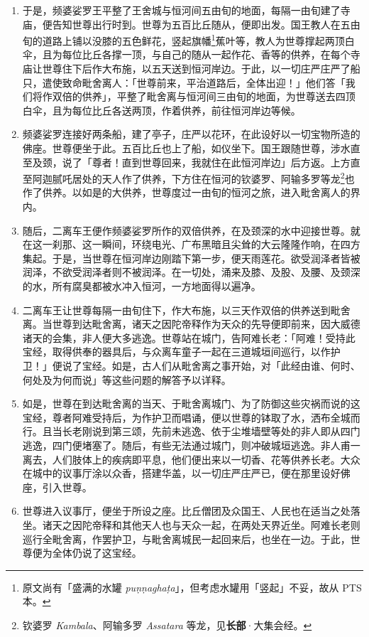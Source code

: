 \begin{enumerate}
\item 于是，频婆娑罗王平整了王舍城与恒河间五由旬的地面，每隔一由旬建了寺庙，便告知世尊出行时到。世尊为五百比丘随从，便即出发。国王教人在五由旬的道路上铺以没膝的五色鲜花，竖起旗幡\footnote{原文尚有「盛满的水罐 \textit{puṇṇaghaṭa}」，但考虑水罐用「竖起」不妥，故从 PTS 本。}蕉叶等，教人为世尊撑起两顶白伞，且为每位比丘各撑一顶，与自己的随从一起作花、香等的供养，在每个寺庙让世尊住下后作大布施，以五天送到恒河岸边。于此，以一切庄严庄严了船只，遣使致命毗舍离人：「世尊前来，平治道路后，全体出迎！」他们答「我们将作双倍的供养」，平整了毗舍离与恒河间三由旬的地面，为世尊送去四顶白伞，且为每位比丘各送两顶，作着供养，前往恒河岸边等候。
\item 频婆娑罗连接好两条船，建了亭子，庄严以花环，在此设好以一切宝物所造的佛座。世尊便坐于此。五百比丘也上了船，如仪坐下。国王跟随世尊，涉水直至及颈，说了「尊者！直到世尊回来，我就住在此恒河岸边」后方返。上方直至阿迦腻吒居处的天人作了供养，下方住在恒河的钦婆罗、阿输多罗等龙\footnote{钦婆罗 \textit{Kambala}、阿输多罗 \textit{Assatara} 等龙，见\textbf{长部}·大集会经。}也作了供养。以如是的大供养，世尊度过一由旬的恒河之旅，进入毗舍离人的界内。
\item 随后，二离车王便作频婆娑罗所作的双倍供养，在及颈深的水中迎接世尊。就在这一刹那、这一瞬间，环绕电光、广布黑暗且尖耸的大云隆隆作响，在四方集起。于是，当世尊在恒河岸边刚踏下第一步，便天雨莲花。欲受润泽者皆被润泽，不欲受润泽者则不被润泽。在一切处，涌来及膝、及股、及腰、及颈深的水，所有腐臭都被水冲入恒河，一方地面得以遍净。
\item 二离车王让世尊每隔一由旬住下，作大布施，以三天作双倍的供养送到毗舍离。当世尊到达毗舍离，诸天之因陀帝释作为天众的先导便即前来，因大威德诸天的会集，非人便大多逃逸。世尊站在城门，告阿难长老：「阿难！受持此宝经，取得供奉的器具后，与众离车童子一起在三道城垣间巡行，以作护卫！」便说了宝经。如是，古人们从毗舍离之事开始，对「此经由谁、何时、何处及为何而说」等这些问题的解答予以详释。
\item 如是，世尊在到达毗舍离的当天、于毗舍离城门、为了防御这些灾祸而说的这宝经，尊者阿难受持后，为作护卫而唱诵，便以世尊的钵取了水，洒布全城而行。且当长老刚说到第三颂，先前未逃逸、依于尘堆墙壁等处的非人即从四门逃逸，四门便堵塞了。随后，有些无法通过城门，则冲破城垣逃逸。非人甫一离去，人们肢体上的疾病即平息，他们便出来以一切香、花等供养长老。大众在城中的议事厅涂以众香，搭建华盖，以一切庄严庄严已，便在那里设好佛座，引入世尊。
\item 世尊进入议事厅，便坐于所设之座。比丘僧团及众国王、人民也在适当之处落坐。诸天之因陀帝释和其他天人也与天众一起，在两处天界近坐。阿难长老则巡行全毗舍离，作罢护卫，与毗舍离城民一起回来后，也坐在一边。于此，世尊便为全体仍说了这宝经。\end{enumerate}

